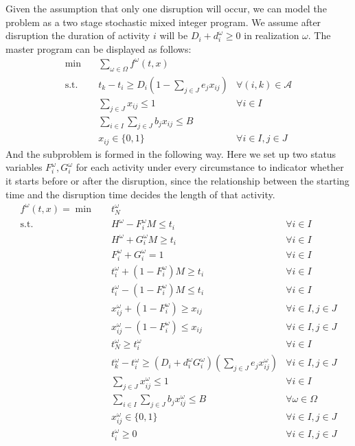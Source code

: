 \documentclass[11pt]{article}
\newcommand{\noi}{\noindent}
\begin{document}
\noi Given the assumption that only one disruption will occur, we can model the problem as a two stage stochastic mixed integer program. We assume after disruption the duration of activity \(i\) will be \(D_i + d_i^\omega \geq 0\) in realization \(\omega\). The master program can be displayed as follows:
	\begin{subequations}
		\begin{align}
			\min \quad & \sum_{\omega \in \Omega} f^\omega(t,x) &\\
			\text{s.t.} \quad & t_k - t_i \geq D_i(1 - \sum_{j \in J} e_jx_{ij}) & \forall (i,k) \in \mathcal{A}\\
			& \sum_{j \in J} x_{ij} \leq 1 & \forall i \in I\\
			& \sum_{i \in I}\sum_{j \in J} b_jx_{ij} \leq B &\\
			& x_{ij} \in \{0,1\} & \forall i \in I, j \in J
		\end{align}
		\label{masterOrigin}
	\end{subequations}
And the subproblem is formed in the following way. Here we set up two status variables \(F_i^\omega, G_i^\omega\) for each activity under every circumstance to indicator whether it starts before or after the disruption, since the relationship between the starting time and the disruption time decides the length of that activity.
	\begin{subequations}
		\begin{align}
			f^\omega(t,x) = \min \quad & t_N^\omega &\\
			\text{s.t.} \quad & H^\omega - F_i^\omega M \leq t_i & \forall i \in I\\
			& H^\omega + G_i^\omega M \geq t_i & \forall i \in I\\
			& F_i^\omega + G_i^\omega = 1 & \forall i \in I\\
			& t_i^\omega + (1 - F_i^\omega)M \geq t_i & \forall i \in I\\
			& t_i^\omega - (1 - F_i^\omega)M \leq t_i & \forall i \in I\\
			& x_{ij}^\omega + (1 - F_i^\omega) \geq x_{ij} & \forall i \in I, j \in J \\
			& x_{ij}^\omega - (1 - F_i^\omega) \leq x_{ij} & \forall i \in I, j \in J \\
			& t_N^\omega \geq t_i^\omega & \forall i \in I\\
			& t_k^\omega - t_i^\omega \geq (D_i + d_i^\omega G_i^\omega)(\sum_{j \in J} e_jx_{ij}^\omega) & \forall i \in I, j \in J \label{constr:Duration}\\
			& \sum_{j \in J} x_{ij}^\omega \leq 1 & \forall i \in I \\
			& \sum_{i \in I}\sum_{j \in J} b_jx_{ij}^\omega \leq B & \forall \omega \in \Omega\\
			& x_{ij}^\omega \in \{0,1\} & \forall i \in I, j \in J\\
			& t_{i}^\omega \geq 0 & \forall i \in I, j \in J
		\end{align}
	\end{subequations}
\end{document}
